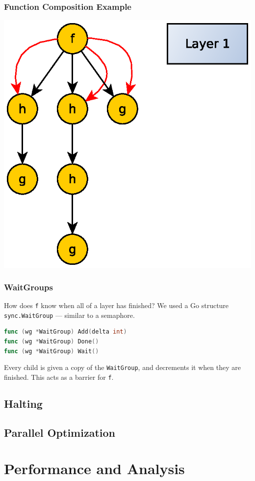 \documentclass{beamer}
\begin{document}
\begin{frame}
  \frametitle{Function Composition Example}
  \centerline{\includegraphics[width=.6\linewidth]{media/inout1.eps}}
\end{frame}

\begin{frame}[fragile]
  \frametitle{WaitGroups}
  
  How does \texttt{f} know when all of a layer has finished? We used a
  Go structure \texttt{sync.WaitGroup} --- similar to a semaphore.

  \begin{lstlisting}[language=Go]
func (wg *WaitGroup) Add(delta int)
func (wg *WaitGroup) Done()
func (wg *WaitGroup) Wait()
  \end{lstlisting}

  \vspace{2em}
  Every child is given a copy of the \texttt{WaitGroup}, and
  decrements it when they are finished. This acts as a barrier for \texttt{f}.
\end{frame}


\subsection{Halting}


\subsection{Parallel Optimization}


\section{Performance and Analysis}

\end{document}
